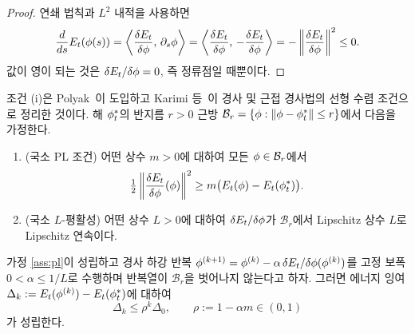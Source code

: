 \begin{proof}
연쇄 법칙과 $L^2$ 내적을 사용하면
\[
  \frac{d}{ds}E_t(\phi(s))
  = \left\langle \frac{\delta E_t}{\delta\phi},\, \partial_s \phi \right\rangle
  = \left\langle \frac{\delta E_t}{\delta\phi},\, -\frac{\delta E_t}{\delta\phi} \right\rangle
  = -\left\lVert \frac{\delta E_t}{\delta\phi} \right\rVert^2 \le 0.
\]
값이 영이 되는 것은 $\delta E_t/\delta\phi = 0$, 즉 정류점일 때뿐이다.
\end{proof}

\begin{assumption}
\label{ass:pl}
조건 (i)은 Polyak~\citep{polyak1963_gradient}이 도입하고 Karimi
등~\citep{karimi2016_linear}이 경사 및 근접 경사법의 선형 수렴 조건으로 정리한
것이다.
해 $\phi^*_t$의 반지름 $r>0$ 근방
$\mathcal{B}_r = \{\phi : \left\lVert \phi-\phi^*_t \right\rVert\le r\}$에서 다음을 가정한다.
\begin{enumerate}[label=(\roman*)]
  \item (국소 PL 조건) 어떤 상수 $m>0$에 대하여 모든 $\phi\in\mathcal{B}_r$에서
  \begin{equation}
    \tfrac{1}{2}\left\lVert \frac{\delta E_t}{\delta\phi}(\phi) \right\rVert^2
    \ge m\bigl(E_t(\phi)-E_t(\phi^*_t)\bigr).
    \label{eq:pl}
  \end{equation}
  \item (국소 $L$-평활성) 어떤 상수 $L>0$에 대하여 $\delta E_t/\delta\phi$가
  $\mathcal{B}_r$에서 Lipschitz 상수 $L$로 Lipschitz 연속이다.
\end{enumerate}
\end{assumption}


\begin{lemma}[국소 선형 수렴; 기지 결과의 적용]
\label{lem:linear-conv}
가정 \ref{ass:pl}이 성립하고 경사 하강 반복
$\phi^{(k+1)} = \phi^{(k)} - \alpha\,\delta E_t/\delta\phi(\phi^{(k)})$를 고정 보폭
$0<\alpha\le 1/L$로 수행하며 반복열이 $\mathcal{B}_r$을 벗어나지 않는다고 하자.
그러면 에너지 잉여 $\Delta_k := E_t(\phi^{(k)})-E_t(\phi^*_t)$에 대하여
\begin{equation}
  \Delta_k \le \rho^k \Delta_0, \qquad \rho := 1-\alpha m \in (0,1)
  \label{eq:linear-conv}
\end{equation}
가 성립한다.
\end{lemma}

